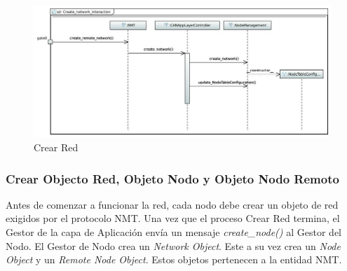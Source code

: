 \begin{figure}[h!]
 \centering
 \includegraphics[scale=0.4]{images/Secciones/AppendixA/Create_Network.JPG}
  \caption{Crear Red}
  \label{fig:ProtocolNMTConnectNet}
\end{figure} 

\subsubsection{Crear Objecto Red, Objeto Nodo y Objeto Nodo Remoto}
Antes de comenzar a funcionar la red, cada nodo debe crear un objeto de red
exigidos por el protocolo NMT. Una vez que el proceso Crear Red termina,
el Gestor de la capa de Aplicación envía un mensaje \textit{create\_node()}
al Gestor del Nodo. El Gestor de Nodo crea un \textit{Network Object}. Este a su
vez crea un \textit{Node Object} y un \textit{Remote Node Object}. Estos objetos
pertenecen a la entidad NMT.

